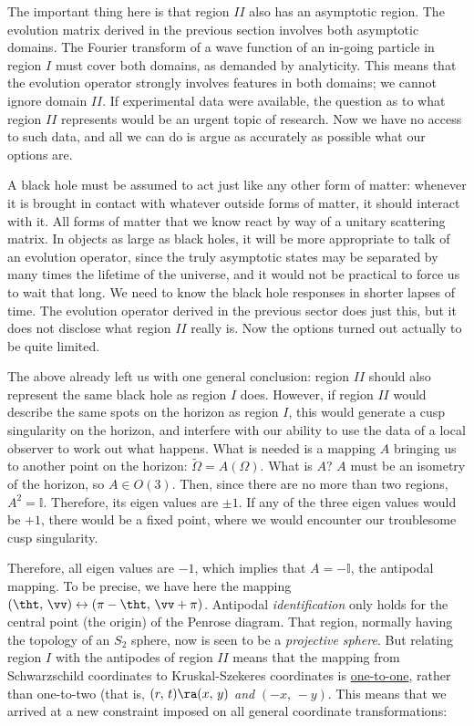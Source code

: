 \documentclass[12pt]{article}
\def\W{\Omega}    		\def\z{\zeta}  		\def\dd{{\rm d}} 		\def\HH{{\mathcal H}}
\def\tl#1{\tilde{#1}}
\begin{document}
The important thing here is that region \(II\) also has an asymptotic region. The evolution matrix derived in the previous section involves both asymptotic domains. The Fourier transform of a wave function of an in-going particle in region \(I\) must cover both domains, as demanded by analyticity. This means that the evolution operator strongly involves features in both domains; we cannot ignore domain \(II\). If experimental data were available, the question as to what region \(II\) represents would be an urgent topic of research. Now we have no access to such data, and all we can do is argue as accurately as possible what our options are.

A black hole must be assumed to act just like any other form of matter: whenever it is brought in contact with whatever outside forms of matter, it should interact with it. All forms of matter that we know react by way of a unitary scattering matrix. In objects as large as black holes, it will be more appropriate to talk of an evolution operator, since the truly asymptotic states may be separated by many times the lifetime of the universe, and it would not be practical to force us to wait that long. We need to know the black hole responses in shorter lapses of time. The evolution operator derived in the previous sector does just this, but it does not disclose what region \(II\) really is. Now the options turned out actually to be quite limited.

The above already left us with one general conclusion: region \(II\) should also represent the same black hole as region \(I\) does. However, if region \(II\) would describe the same spots on the horizon as region \(I\), this would generate a cusp singularity on the horizon, and interfere with our ability to use the data of a local observer to work out what happens. What is needed is a mapping \(A\) bringing us to another point on the horizon: \(\tl\W=A(\W)\). What is \(A\)?
\(A\) must be an isometry of the horizon, so \(A\in O(3)\). Then, since there are no more than two regions, \(A^2=\mathbb I\). Therefore, its eigen values are \(\pm 1\). If any of the three eigen values would be \(+1\), there would be a fixed point, where we would encounter our troublesome cusp singularity. 

Therefore, all eigen values are \(-1\), which implies that \(A=-\mathbb I\), the antipodal mapping. To be precise, we have here the mapping \((\tht,\,\vv)\leftrightarrow (\pi-\tht,\,\vv+\pi)\). Antipodal \emph{identification} only holds for the central point (the origin) of the Penrose diagram. That region, normally having the topology of an \(S_2\) sphere, now is seen to be a \emph{projective sphere}. But relating region \(I\) with the antipodes of region \(II\) means that the mapping from Schwarzschild coordinates to Kruskal-Szekeres coordinates is \ul{one-to-one}, rather than one-to-two (that is, \((r,\,t)\ra (x,\,y)\) \emph{and} \((-x,\,-y)\). This means that we arrived at a new constraint imposed on all general coordinate transformations: 
\end{document}
